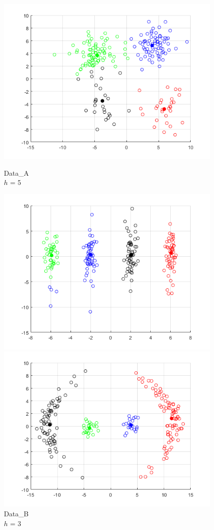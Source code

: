 \documentclass[12pt]{article}
\begin{document}
\begin{figure}[H]
	  \includegraphics[width=\linewidth]{figs/1-b-meanshift-a.png}
	  \caption{Data\_A \\$h$ = 5}\label{fig:kmeans-a}
	\endminipage\hfill
	  \includegraphics[width=\linewidth]{figs/1-b-meanshift-b.png}
	  \caption{Data\_B \\$h$ = 3}\label{fig:kmeans-b}
	\endminipage\hfill
	  \includegraphics[width=\linewidth]{figs/1-b-meanshift-c.png}

\end{figure}
\end{document}
